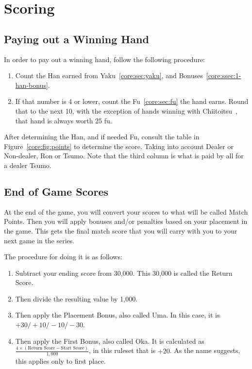 \section{Scoring}\label{core:sec:scoring}

\subsection{Paying out a Winning Hand}\label{core:sec:paying-hand}

In order to pay out a winning hand, follow the following procedure:
\begin{enumerate}
	\item Count the Han earned from Yaku~\ref{core:sec:yaku}, and Bonuses~\ref{core:ssec:1-han-bonus}.
	\item If that number is 4 or lower, count the Fu~\ref{core:sec:fu} the hand earns. Round that to the next 10, with the exception of hands winning with Chiitoitsu~, that hand is always worth 25 fu.
\end{enumerate}

After determining the Han, and if needed Fu, consult the table in Figure~\ref{core:fig:points} to determine the score. Taking into account Dealer or Non-dealer, Ron or Tsumo. Note that the third column is what is paid by all for a dealer Tsumo.



\subsection{End of Game Scores}\label{core:sec:end-scores}

At the end of the game, you will convert your scores to what will be called Match Points. Then you will apply bonuses and/or penalties based on your placement in the game. This gets the final match score that you will carry with you to your next game in the series.

The procedure for doing it is as follows:
\begin{enumerate}
	\item Subtract your ending score from 30,000. This 30,000 is called the Return Score.
	\item Then divide the resulting value by 1,000.
	\item Then apply the Placement Bonus, also called Uma. In this case, it is \(+30/+10/-10/-30\).
	\item Then apply the First Bonus, also called Oka. It is calculated as \(\frac{4\times(\text{Return Score} - \text{Start Score})}{1,000}\), in this ruleset that is \(+20\). As the name suggests, this applies only to first place.
\end{enumerate}


